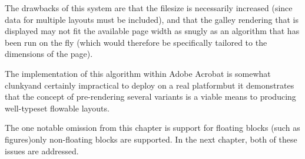The drawbacks of this system are that the filesize is necessarily increased (since data for multiple layouts must be included), and that the galley rendering that is displayed may not fit the available page width as snugly as an algorithm that has been run on the fly (which would therefore be specifically tailored to the dimensions of the page).

The implementation of this algorithm within Adobe Acrobat is somewhat clunky\ed and certainly impractical to deploy on a real \ebook{} platform\ed but it demonstrates that the concept of pre-ren\-der\-ing several variants is a viable means to producing well-typeset flowable layouts.

The one notable omission from this chapter is support for floating blocks (such as figures)\ed only non-floating blocks are supported. In the next chapter, both of these issues are addressed.

